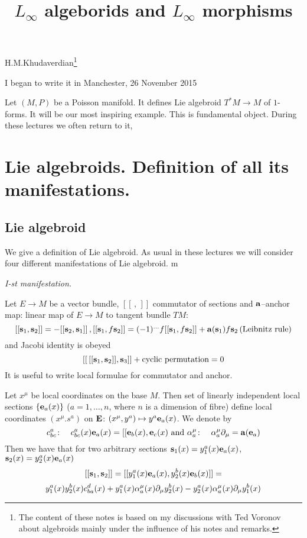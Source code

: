 \documentclass[12pt]{article}
\title{$L_\infty$ algeborids and $L_\infty$ morphisms}
\date{}
\theoremstyle{theorem}
\numberwithin{equation}{section}
\begin{document}
\maketitle

  \centerline {H.M.Khudaverdian\footnote{The content of these notes is
based on my discussions  with Ted Voronov
about algebroids  mainly under the influence of his notes and remarks.}}

   \centerline { I began to write it in Manchester, 26 November  2015}





\tableofcontents
{}
\newpage
{}

 Let $(M,P)$ be a Poisson manifold. It defines
Lie algebroid $T^*M\to M$ of $1$-forms. It will be
 our most inspiring example. This is fundamental object. 
During these lectures we often return to it,


\section {Lie algebroids. Definition of all its manifestations.}

\subsection {Lie algebroid}

  We give a definition of Lie algebroid. 
As usual in these lectures we will consider 
four different manifestations of Lie algebroid.
m

{\sl I-st manifestation.}  

Let $E\to M$ be a vector bundle,
$[[\,,\,]]$ commutator of sections and
   ${\bf a}$--anchor map: linear map  of $E\to M$
to tangent bundle $TM$:
            $$
[[{\bf s}_1,{\bf s}_2]]=-[[{\bf s}_2,{\bf s}_1]]\,,
 [[{\bf s}_1,f{\bf s}_2]]=(-1)^{...}f[[{\bf s}_1,f{\bf s}_2]]+
    {\bf a}({\bf s}_1)f{\bf s}_2\,\hbox{(Leibnitz rule)}
           $$
and Jacobi identity is obeyed
           \begin{equation*}\label{jacobi}
  [[\,[[{\bf s}_1,{\bf s}_2]],{\bf s}_3]]+\hbox{cyclic permutation}=0
            \end{equation*}
It is useful to write local formulae for commutator and anchor.

  Let $x^\mu$ be local coordinates on the base $M$. Then
 set of linearly independent local sections $\{{\bf e}_a(x)\}$
($a=1,\dots,n$, where $n$ is a dimension of fibre) define
local coordinates $(x^\mu.s^a)$ on ${\bf E}$: $(x^\mu,y^a)\mapsto y^a{\bf e}_a(x)$.    
   We denote by
                  \begin{equation}\label{defofalgebroid1}
      c^a_{bc}\colon\quad        c^a_{bc}(x){\bf e}_a(x)=[[{\bf e}_b(x),{\bf e}_c(x)\,\,
  {\rm and}\,\, \alpha^\mu_a\colon\quad \alpha^\mu_a\partial_\mu={\bf a}({\bf e}_a)
                    \end{equation}
Then we have that for two arbitrary sections  
${\bf s}_1(x)=y^a_1(x){\bf e}_a(x)$,${\bf s}_2(x)=y^a_2(x){\bf e}_a(x)$
                  $$
[[{\bf s}_1,{\bf s}_2]]=[[y^a_1(x){\bf e}_a(x),y^b_2(x){\bf e}_b(x)]]=
                   $$
                   $$
y^a_1(x)y^b_2(x)c_{ba}^d(x)+
    y^a_1(x)\alpha_a^\mu(x)\partial_\mu y^b_2(x)-y^a_2(x)\alpha_a^\mu(x)\partial_\mu y^b_1(x)
                $$
                  
\end{document}
